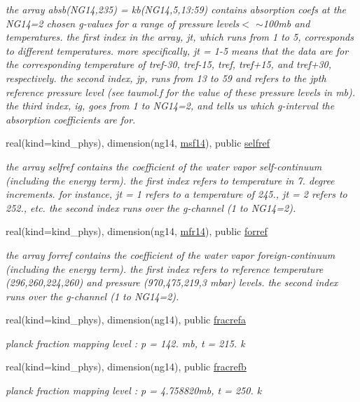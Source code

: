 \begin{Indent}
\begin{DoxyCompactItemize}
\begin{DoxyCompactList}\small\item\em the array absb(\+N\+G14,235) = kb(\+N\+G14,5,13\+:59) contains absorption coefs at the N\+G14=2 chosen g-\/values for a range of pressure levels$<$ $\sim$100mb and temperatures. the first index in the array, jt, which runs from 1 to 5, corresponds to different temperatures. more specifically, jt = 1-\/5 means that the data are for the corresponding temperature of tref-\/30, tref-\/15, tref, tref+15, and tref+30, respectively. the second index, jp, runs from 13 to 59 and refers to the jpth reference pressure level (see taumol.\+f for the value of these pressure levels in mb). the third index, ig, goes from 1 to N\+G14=2, and tells us which g-\/interval the absorption coefficients are for. \end{DoxyCompactList}\item 
real(kind=kind\+\_\+phys), dimension(ng14, \hyperlink{group__module__radlw__kgbnn_ga37c15d52e45cd6b36dc246a059b0c5ca}{msf14}), public \hyperlink{group__module__radlw__kgbnn_ga0e390a41b1c9e2ece765d65774060bca}{selfref}
\begin{DoxyCompactList}\small\item\em the array selfref contains the coefficient of the water vapor self-\/continuum (including the energy term). the first index refers to temperature in 7. degree increments. for instance, jt = 1 refers to a temperature of 245., jt = 2 refers to 252., etc. the second index runs over the g-\/channel (1 to N\+G14=2). \end{DoxyCompactList}\item 
real(kind=kind\+\_\+phys), dimension(ng14, \hyperlink{group__module__radlw__kgbnn_ga52354badbce95c005b19bd5a443fd488}{mfr14}), public \hyperlink{group__module__radlw__kgbnn_ga8478067cb8a07a02b56c09fa3c73eb67}{forref}
\begin{DoxyCompactList}\small\item\em the array forref contains the coefficient of the water vapor foreign-\/continuum (including the energy term). the first index refers to reference temperature (296,260,224,260) and pressure (970,475,219,3 mbar) levels. the second index runs over the g-\/channel (1 to N\+G14=2). \end{DoxyCompactList}\item 
real(kind=kind\+\_\+phys), dimension(ng14), public \hyperlink{group__module__radlw__kgbnn_gae1e7065b9ea30b36a3665ad594545e9b}{fracrefa}
\begin{DoxyCompactList}\small\item\em planck fraction mapping level \+: p = 142. mb, t = 215. k \end{DoxyCompactList}\item 
real(kind=kind\+\_\+phys), dimension(ng14), public \hyperlink{group__module__radlw__kgbnn_ga13a211bf8a903d0720fa72ac90e4fc3f}{fracrefb}
\begin{DoxyCompactList}\small\item\em planck fraction mapping level \+: p = 4.\+758820mb, t = 250. k \end{DoxyCompactList}\end{DoxyCompactItemize}
\end{Indent}
